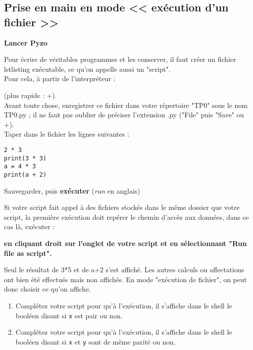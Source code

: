 \ifprof
\vspace{1cm}
\else
\begin{multicols}{2}
\fi


\section*{Prise en main en mode << exécution d'un fichier >>}
\textbf{Lancer Pyzo}

Pour écrire de véritables programmes et les conserver, il faut créer un fichier lstlisting exécutable, ce qu'on appelle aussi un "script".\\ 
Pour cela, à partir de l'interpréteur : 
\begin{center} 
\end{center} (plus rapide : +).\\

Avant toute chose, enregistrer ce fichier dans votre répertoire "TP0" sous le nom TP0.py ; il ne faut pas oublier de préciser  l'extension .py ("File" puis "Save" ou +).\\


Taper dans le fichier les lignes suivantes : 
\begin{lstlisting}
2 * 3
print(3 * 3)
a = 4 * 3
print(a + 2)
\end{lstlisting}
Sauvegarder, puis \textbf{exécuter} (\textit{run} en anglais) 
\begin{center} 
\end{center}

Si votre script fait appel à des fichiers stockés dans le même dossier que votre script, la première exécution doit repérer le chemin d'accès aux données, dans ce cas là, exécuter :
\begin{center} 
\textbf{en cliquant droit sur l'onglet de votre script et en sélectionnant "Run file as script".}
\end{center}
\ifprof
\begin{corrige}
Seul le résultat de 3*5 et de a+2 s'est affiché. Les autres calculs ou affectations ont bien été effectués mais non affichés. En mode "exécution de fichier", on peut donc choisir ce qu'on affiche.
\end{corrige}
\else
\fi

\exer{}

\begin{enumerate}
\item Complétez votre script pour qu'à l'exécution,  il s'affiche dans le shell le booléen disant si \texttt{x} est pair ou non.
\item Complétez votre script pour qu'à l'exécution,  il s'affiche dans le shell le booléen disant si \texttt{x} et \texttt{y} sont de même parité ou non.
\end{enumerate}



\end{multicols}
